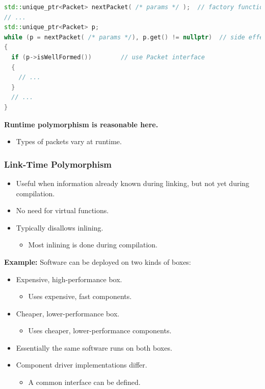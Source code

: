 \begin{lstlisting}[language=C++]
std::unique_ptr<Packet> nextPacket( /* params */ );  // factory function; returns next packet
// ...
std::unique_ptr<Packet> p;
while (p = nextPacket( /* params */), p.get() != nullptr)  // side effect, comma operator
{
  if (p->isWellFormed())        // use Packet interface
  {
    // ...
  }
  // ...
}
\end{lstlisting}
\textbf{Runtime polymorphism is reasonable here.}
\begin{itemize}
  \item Types of packets vary at runtime.
\end{itemize}

\subsubsection{Link-Time Polymorphism}
\begin{itemize}
  \item Useful when information already known during linking, but not yet during compilation.
  \item No need for virtual functions.
  \item Typically disallows inlining.
  \begin{itemize}
    \item Most inlining is done during compilation.
  \end{itemize}
\end{itemize}
\textbf{Example:}
Software can be deployed on two kinds of boxes:
\begin{itemize}
  \item Expensive, high-performance box.
  \begin{itemize}
    \item Uses expensive, fast components.
  \end{itemize}
  \item Cheaper, lower-performance box.
  \begin{itemize}
    \item Uses cheaper, lower-performance components.
  \end{itemize}
  \item Essentially the same software runs on both boxes.
  \item Component driver implementations differ.
  \begin{itemize}
    \item A common interface can be defined.
  \end{itemize}
\end{itemize}
